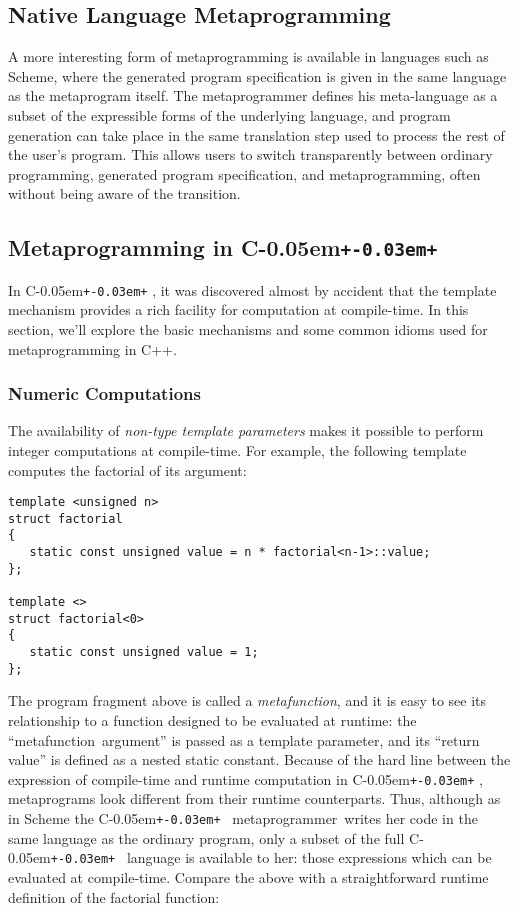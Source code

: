 \documentclass{kapproc}
\newcommand{\Cpp}{C\kern-0.05em\texttt{+\kern-0.03em+}%
}
\newcommand{\mping}{meta\-pro\-gram\-ming}
\newcommand{\mpgm}{meta\-pro\-gram}
\newcommand{\mpgmer}{meta\-pro\-gram\-mer}
\newcommand{\mfn}{meta\-func\-tion}
\begin{document}
\subsection{Native Language Metaprogramming}

A more interesting form of \mping{} is available in languages
such as Scheme, where the generated program specification is given in
the same language as the \mpgm{} itself. The metaprogrammer
defines his meta-language as a subset of the expressible forms of the
underlying language, and program generation can take place in the same
translation step used to process the rest of the user's program. This
allows users to switch transparently between ordinary programming,
generated program specification, and \mping{}, often without
being aware of the transition.

\subsection{Metaprogramming in \Cpp{}}

In \Cpp, it was discovered almost by accident that the template
mechanism provides a rich facility for computation at compile-time. In
this section, we'll explore the basic mechanisms and some common
idioms used for metaprogramming in C++.

\subsubsection{Numeric Computations}

The availability of \emph{non-type template parameters} makes it
possible to perform integer computations at compile-time. For example,
the following template computes the factorial of its
argument:

{\small
\begin{codesamp}\begin{verbatim}
template <unsigned n>
struct factorial
{
   static const unsigned value = n * factorial<n-1>::value;
};

template <>
struct factorial<0>
{
   static const unsigned value = 1;
};
\end{verbatim}
\end{codesamp}
}

The program fragment above is called a \emph{\mfn}, and it is easy to
see its relationship to a function designed to be evaluated at
runtime: the ``\mfn\ argument'' is passed as a template parameter, and
its ``return value'' is defined as a nested static constant.  Because
of the hard line between the expression of compile-time and runtime
computation in \Cpp, metaprograms look different from their runtime
counterparts. Thus, although as in Scheme the \Cpp\ \mpgmer\ writes
her code in the same language as the ordinary program, only a subset
of the full \Cpp\ language is available to her: those expressions
which can be evaluated at compile-time. Compare the above with a
straightforward runtime definition of the factorial function:
\end{document}
